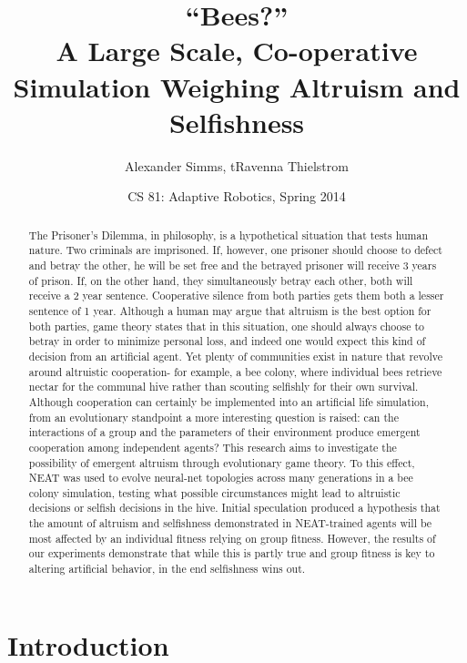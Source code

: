 \documentclass[11pt]{article}
\title  {``Bees?''\\ A Large Scale, Co-operative Simulation 
         Weighing Altruism and Selfishness}
\author {Alexander Simms, tRavenna Thielstrom}
\date   {CS 81: Adaptive Robotics, Spring 2014}
\begin{document}
	\maketitle

	\begin{abstract}

		The Prisoner’s Dilemma, in philosophy, is a hypothetical situation that tests human nature. Two criminals are imprisoned. If, however, one prisoner should choose to defect and betray the other, he will be set free and the betrayed prisoner will receive 3 years of prison. If, on the other hand, they simultaneously betray each other, both will receive a 2 year sentence. Cooperative silence from both parties gets them both a lesser sentence of 1 year. Although a human may argue that altruism is the best option for both parties, game theory states that in this situation, one should always choose to betray in order to minimize personal loss, and indeed one would expect this kind of decision from an artificial agent. Yet plenty of communities exist in nature that revolve around altruistic cooperation- for example, a bee colony, where individual bees retrieve nectar for the communal hive rather than scouting selfishly for their own survival. Although cooperation can certainly be implemented into an artificial life simulation, from an evolutionary standpoint a more interesting question is raised: can the interactions of a group and the parameters of their environment produce emergent cooperation among independent agents? This research aims to investigate the possibility of emergent altruism through evolutionary game theory. To this effect, NEAT was used to evolve neural-net topologies across many generations in a bee colony simulation, testing what possible circumstances might lead to altruistic decisions or selfish decisions in the hive. Initial speculation produced a hypothesis that the amount of altruism and selfishness demonstrated in NEAT-trained agents will be most affected by an individual fitness relying on group fitness. However, the results of our experiments demonstrate that while this is partly true and group fitness is key to altering artificial behavior, in the end selfishness wins out.


	\end{abstract}

	\section{Introduction} %
	\label{sec:introduction}
		
\end{document}
